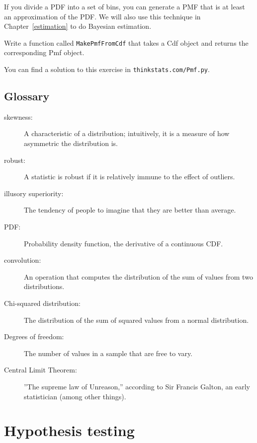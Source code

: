 \documentclass[12pt]{book}
\begin{document}
If you divide a PDF into a set of bins, you can generate a PMF that is
at least an approximation of the PDF.  We will also use this
technique in Chapter~\ref{estimation} to do Bayesian estimation.

\begin{ex}

Write a function called {\tt MakePmfFromCdf} that takes a Cdf object
and returns the corresponding Pmf object.

You can find a solution to this exercise in {\tt thinkstats.com/Pmf.py}.

\end{ex}

\section{Glossary}

\begin{description}

\item[skewness:] A characteristic of a distribution; intuitively, it
is a measure of how asymmetric the distribution is.

\item[robust:] A statistic is robust if it is relatively immune to the
  effect of outliers.

\item[illusory superiority:] The tendency of people to imagine that
they are better than average.

\item[PDF:] Probability density function, the derivative of a continuous CDF.

\item[convolution:] An operation that computes the distribution of the
sum of values from two distributions. 

\item[Chi-squared distribution:] The distribution of the sum of squared
values from a normal distribution.

\item[Degrees of freedom:] The number of values in a sample that are
free to vary.

\item[Central Limit Theorem:] ''The supreme law of Unreason,'' according
to Sir Francis Galton, an early statistician (among other things).

\end{description}


\chapter{Hypothesis testing}
\label{testing}
\end{document}

